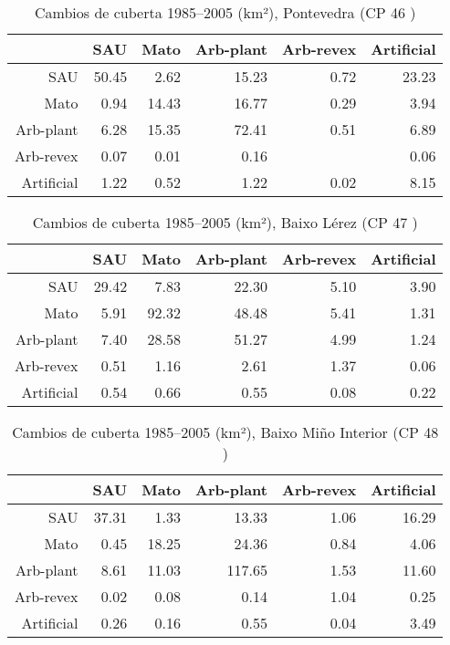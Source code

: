 \begin{table}[p]
\centering
\caption{Cambios de cuberta 1985--2005 (km²), Pontevedra (CP 46 )} 
\label{TaboaContinxCP46}
\begin{tabular}{rrrrrr}
  \hline
 & SAU & Mato & Arb-plant & Arb-revex & Artificial \\ 
  \hline
SAU & 50.45 & 2.62 & 15.23 & 0.72 & 23.23 \\ 
  Mato & 0.94 & 14.43 & 16.77 & 0.29 & 3.94 \\ 
  Arb-plant & 6.28 & 15.35 & 72.41 & 0.51 & 6.89 \\ 
  Arb-revex & 0.07 & 0.01 & 0.16 &  & 0.06 \\ 
  Artificial & 1.22 & 0.52 & 1.22 & 0.02 & 8.15 \\ 
   \hline
\end{tabular}
\end{table}
\begin{table}[p]
\centering
\caption{Cambios de cuberta 1985--2005 (km²), Baixo Lérez (CP 47 )} 
\label{TaboaContinxCP47}
\begin{tabular}{rrrrrr}
  \hline
 & SAU & Mato & Arb-plant & Arb-revex & Artificial \\ 
  \hline
SAU & 29.42 & 7.83 & 22.30 & 5.10 & 3.90 \\ 
  Mato & 5.91 & 92.32 & 48.48 & 5.41 & 1.31 \\ 
  Arb-plant & 7.40 & 28.58 & 51.27 & 4.99 & 1.24 \\ 
  Arb-revex & 0.51 & 1.16 & 2.61 & 1.37 & 0.06 \\ 
  Artificial & 0.54 & 0.66 & 0.55 & 0.08 & 0.22 \\ 
   \hline
\end{tabular}
\end{table}
\begin{table}[p]
\centering
\caption{Cambios de cuberta 1985--2005 (km²), Baixo Miño Interior (CP 48 )} 
\label{TaboaContinxCP48}
\begin{tabular}{rrrrrr}
  \hline
 & SAU & Mato & Arb-plant & Arb-revex & Artificial \\ 
  \hline
SAU & 37.31 & 1.33 & 13.33 & 1.06 & 16.29 \\ 
  Mato & 0.45 & 18.25 & 24.36 & 0.84 & 4.06 \\ 
  Arb-plant & 8.61 & 11.03 & 117.65 & 1.53 & 11.60 \\ 
  Arb-revex & 0.02 & 0.08 & 0.14 & 1.04 & 0.25 \\ 
  Artificial & 0.26 & 0.16 & 0.55 & 0.04 & 3.49 \\ 
   \hline
\end{tabular}
\end{table}
